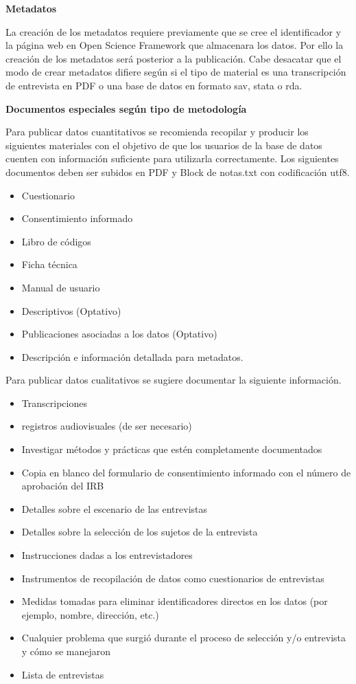 \documentclass[
  spanish,
  letterpaper,
  DIV=11,
  numbers=noendperiod]{scrreprt}
\providecommand{\tightlist}{%
  \setlength{\itemsep}{0pt}\setlength{\parskip}{0pt}}
\begin{document}
\textbf{Metadatos}

La creación de los metadatos requiere previamente que se cree el
identificador y la página web en Open Science Framework que almacenara
los datos. Por ello la creación de los metadatos será posterior a la
publicación. Cabe desacatar que el modo de crear metadatos difiere según
si el tipo de material es una transcripción de entrevista en PDF o una
base de datos en formato sav, stata o rda.

\textbf{Documentos especiales según tipo de metodología}

Para publicar datos cuantitativos se recomienda recopilar y producir los
siguientes materiales con el objetivo de que los usuarios de la base de
datos cuenten con información suficiente para utilizarla correctamente.
Los siguientes documentos deben ser subidos en PDF y Block de notas.txt
con codificación utf8.

\begin{itemize}
\tightlist
\item
  Cuestionario
\item
  Consentimiento informado
\item
  Libro de códigos
\item
  Ficha técnica
\item
  Manual de usuario
\item
  Descriptivos (Optativo)
\item
  Publicaciones asociadas a los datos (Optativo)
\item
  Descripción e información detallada para metadatos.
\end{itemize}

Para publicar datos cualitativos se sugiere documentar la siguiente
información.

\begin{itemize}
\item
  Transcripciones
\item
  registros audiovisuales (de ser necesario)
\item
  Investigar métodos y prácticas que estén completamente documentados
\item
  Copia en blanco del formulario de consentimiento informado con el
  número de aprobación del IRB
\item
  Detalles sobre el escenario de las entrevistas
\item
  Detalles sobre la selección de los sujetos de la entrevista
\item
  Instrucciones dadas a los entrevistadores
\item
  Instrumentos de recopilación de datos como cuestionarios de
  entrevistas
\item
  Medidas tomadas para eliminar identificadores directos en los datos
  (por ejemplo, nombre, dirección, etc.)
\item
  Cualquier problema que surgió durante el proceso de selección y/o
  entrevista y cómo se manejaron
\item
  Lista de entrevistas
\end{itemize}
\end{document}
